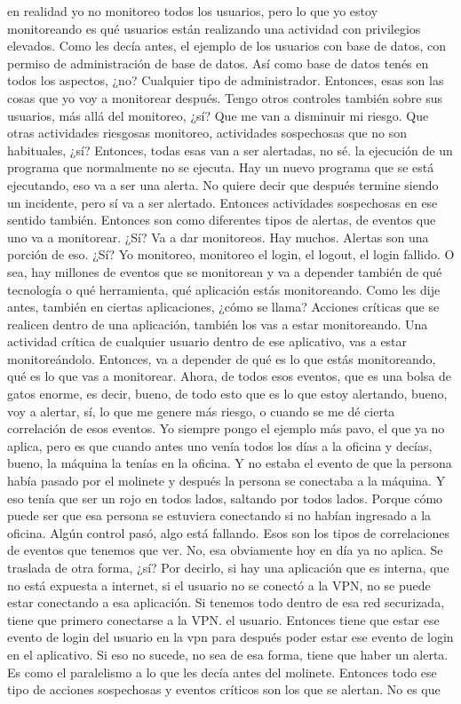 \begin{description}[leftmargin=0cm, labelsep=0.5cm]
    \item[\textbf{JACUBOVICH LUCIANA:}] en realidad yo no monitoreo todos los usuarios, pero lo que yo estoy monitoreando es qué usuarios están realizando una actividad con privilegios elevados. Como les decía antes, el ejemplo de los usuarios con base de datos, con permiso de administración de base de datos. Así como base de datos tenés en todos los aspectos, ¿no? Cualquier tipo de administrador. Entonces, esas son las cosas que yo voy a monitorear después. Tengo otros controles también sobre sus usuarios, más allá del monitoreo, ¿sí? Que me van a disminuir mi riesgo. Que otras actividades riesgosas monitoreo, actividades sospechosas que no son habituales, ¿sí? Entonces, todas esas van a ser alertadas, no sé. la ejecución de un programa que normalmente no se ejecuta. Hay un nuevo programa que se está ejecutando, eso va a ser una alerta. No quiere decir que después termine siendo un incidente, pero sí va a ser alertado. Entonces actividades sospechosas en ese sentido también. Entonces son como diferentes tipos de alertas, de eventos que uno va a monitorear. ¿Sí? Va a dar monitoreos. Hay muchos. Alertas son una porción de eso. ¿Sí? Yo monitoreo, monitoreo el login, el logout, el login fallido. O sea, hay millones de eventos que se monitorean y va a depender también de qué tecnología o qué herramienta, qué aplicación estás monitoreando. Como les dije antes, también en ciertas aplicaciones, ¿cómo se llama? Acciones críticas que se realicen dentro de una aplicación, también los vas a estar monitoreando. Una actividad crítica de cualquier usuario dentro de ese aplicativo, vas a estar monitoreándolo. Entonces, va a depender de qué es lo que estás monitoreando, qué es lo que vas a monitorear. Ahora, de todos esos eventos, que es una bolsa de gatos enorme, es decir, bueno, de todo esto que es lo que estoy alertando, bueno, voy a alertar, sí, lo que me genere más riesgo, o cuando se me dé cierta correlación de esos eventos. Yo siempre pongo el ejemplo más pavo, el que ya no aplica, pero es que cuando antes uno venía todos los días a la oficina y decías, bueno, la máquina la tenías en la oficina. Y no estaba el evento de que la persona había pasado por el molinete y después la persona se conectaba a la máquina. Y eso tenía que ser un rojo en todos lados, saltando por todos lados. Porque cómo puede ser que esa persona se estuviera conectando si no habían ingresado a la oficina. Algún control pasó, algo está fallando. Esos son los tipos de correlaciones de eventos que tenemos que ver. No, esa obviamente hoy en día ya no aplica. Se traslada de otra forma, ¿sí? Por decirlo, si hay una aplicación que es interna, que no está expuesta a internet, si el usuario no se conectó a la VPN, no se puede estar conectando a esa aplicación. Si tenemos todo dentro de esa red securizada, tiene que primero conectarse a la VPN. el usuario. Entonces tiene que estar ese evento de login del usuario en la vpn para después poder estar ese evento de login en el aplicativo. Si eso no sucede, no sea de esa forma, tiene que haber un alerta. Es como el paralelismo a lo que les decía antes del molinete. Entonces todo ese tipo de acciones sospechosas y eventos críticos son los que se alertan. No es que 
\end{description}

